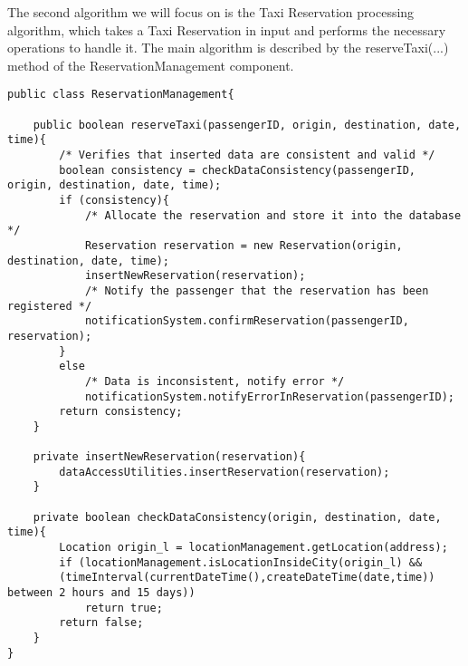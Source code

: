The second algorithm we will focus on is the Taxi Reservation processing algorithm, which takes a Taxi Reservation in input and performs the necessary operations to handle it. The main algorithm is described by the reserveTaxi(...) method of the ReservationManagement component.

\begin{lstlisting}
public class ReservationManagement{

	public boolean reserveTaxi(passengerID, origin, destination, date, time){
		/* Verifies that inserted data are consistent and valid */
		boolean consistency = checkDataConsistency(passengerID, origin, destination, date, time);
		if (consistency){
			/* Allocate the reservation and store it into the database */
			Reservation reservation = new Reservation(origin, destination, date, time);
			insertNewReservation(reservation);
			/* Notify the passenger that the reservation has been registered */
			notificationSystem.confirmReservation(passengerID, reservation);
		}
		else
			/* Data is inconsistent, notify error */
			notificationSystem.notifyErrorInReservation(passengerID);
		return consistency;
	}
	
	private insertNewReservation(reservation){
		dataAccessUtilities.insertReservation(reservation);
	}
	
	private boolean checkDataConsistency(origin, destination, date, time){
		Location origin_l = locationManagement.getLocation(address);
		if (locationManagement.isLocationInsideCity(origin_l) && 
		(timeInterval(currentDateTime(),createDateTime(date,time)) between 2 hours and 15 days))
			return true;
		return false; 
	}
}	
\end{lstlisting}

